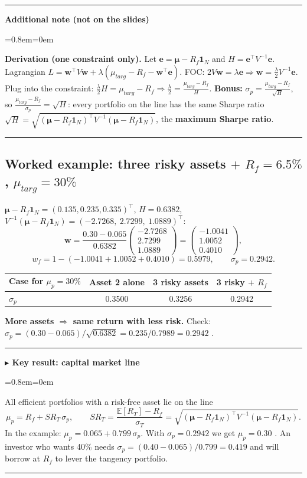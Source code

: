 \documentclass[11pt,a4paper]{report}
\newenvironment{notebox}[1]
  {\par\medskip\Needspace{6\baselineskip}\noindent\rule{\linewidth}{0.4pt}\par\nopagebreak
   \noindent\textbf{#1}\par\nopagebreak
   \begin{list}{}{\leftmargin=0.8em\rightmargin=0em\topsep=2pt}\item[]}
  {\end{list}\nopagebreak\noindent\rule{\linewidth}{0.4pt}\par\medskip}
\newenvironment{keybox}[1][]{\begin{notebox}{$\blacktriangleright$ Key result#1}}{\end{notebox}}
\newenvironment{addnote}{\begin{notebox}{Additional note (not on the slides)}}{\end{notebox}}
\newcommand{\E}{\mathbb{E}}
\newcommand{\one}{\mathbf{1}_N}
\newcommand{\w}{\bm{w}}
\newcommand{\T}{^{\top}}
\newcommand{\mub}{\bm{\mu}}
\begin{document}
\begin{addnote}
\textbf{Derivation (one constraint only).} Let $\bm e=\mub-R_f\one$ and
$H=\bm e\T V^{-1}\bm e$. Lagrangian $L=\w\T V\w+\lambda(\mu_{targ}-R_f-\w\T\bm e)$.
FOC: $2V\w=\lambda\bm e\Rightarrow\w=\frac\lambda2V^{-1}\bm e$. Plug into the
constraint: $\frac\lambda2H=\mu_{targ}-R_f\Rightarrow\frac\lambda2=\frac{\mu_{targ}-R_f}{H}$.
\textbf{Bonus:} $\sigma_p=\frac{\mu_{targ}-R_f}{\sqrt H}$, so
$\frac{\mu_{targ}-R_f}{\sigma_p}=\sqrt H$: every portfolio on the line has the
same Sharpe ratio $\sqrt H=\sqrt{(\mub-R_f\one)\T V^{-1}(\mub-R_f\one)}$, the
\textbf{maximum Sharpe ratio}.
\end{addnote}

\subsection{Worked example: three risky assets $+$ $R_f=6.5\%$, $\mu_{targ}=30\%$}
$\mub-R_f\one=(0.135,0.235,0.335)\T$, $H=0.6382$, $V^{-1}(\mub-R_f\one)=(-2.7268,\ 2.7299,\ 1.0889)\T$:
\[
\w=\frac{0.30-0.065}{0.6382}\begin{pmatrix}-2.7268\\2.7299\\1.0889\end{pmatrix}
=\begin{pmatrix}-1.0041\\1.0052\\0.4010\end{pmatrix},
\]
\[
w_f=1-(-1.0041+1.0052+0.4010)=0.5979,\qquad \sigma_p=0.2942 .
\]
\begin{center}
\begin{tabular}{@{}lccc@{}}
\toprule
Case for $\mu_p=30\%$ & Asset 2 alone & 3 risky assets & 3 risky $+$ $R_f$\\
\midrule
$\sigma_p$ & 0.3500 & 0.3256 & 0.2942 \\
\bottomrule
\end{tabular}
\end{center}
\textbf{More assets $\Rightarrow$ same return with less risk.} Check:
$\sigma_p=(0.30-0.065)/\sqrt{0.6382}=0.235/0.7989=0.2942$ \checkmark.


\begin{keybox}[: capital market line]
All efficient portfolios with a risk-free asset lie on the line
\[
\mu_p=R_f+SR_T\,\sigma_p,\qquad SR_T=\frac{\E[R_T]-R_f}{\sigma_T}=\sqrt{(\mub-R_f\one)\T V^{-1}(\mub-R_f\one)} .
\]
In the example: $\mu_p=0.065+0.799\,\sigma_p$. With $\sigma_p=0.2942$ we get
$\mu_p=0.30$ \checkmark. An investor who wants 40\% needs $\sigma_p=(0.40-0.065)/0.799=0.419$
and will borrow at $R_f$ to lever the tangency portfolio.
\end{keybox}
\end{document}
